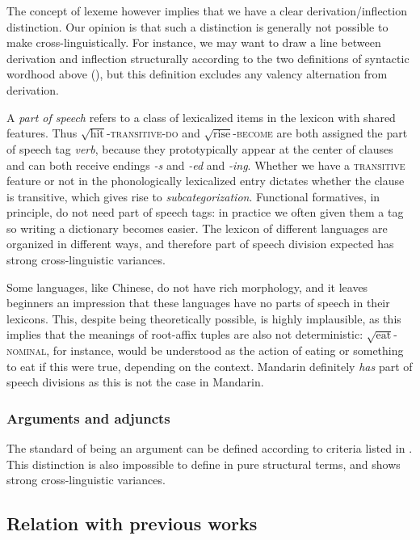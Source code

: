 \documentclass[UTF8, a4paper, oneside, scheme=plain, 12pt]{ctexrep}
\newcommand*{\term}[1]{\emph{#1}}
\newcommand{\form}[1]{\emph{#1}}
\newcommand*{\category}[1]{\textsc{#1}}
\newcommand*{\wordroot}[1]{$\sqrt{\text{#1}}$}
\begin{document}
{The concept of lexeme however implies that we have a clear derivation/inflection distinction.
Our opinion is that such a distinction is generally not possible to make cross-linguistically.
For instance, we may want to draw a line between derivation and inflection structurally
according to the two definitions of syntactic wordhood above (),
but this definition excludes any valency alternation from derivation.

A \term{part of speech} refers to a class of lexicalized items in the lexicon with shared features.
Thus \wordroot{hit}-\category{transitive}-\category{do}
and \wordroot{rise}-\category{become}
are both assigned the part of speech tag \term{verb},
because they prototypically appear at the center of clauses
and can both receive endings \form{-s} and \form{-ed} and \form{-ing}.
Whether we have a \category{transitive} feature or not in the phonologically lexicalized entry
dictates whether the clause is transitive,
which gives rise to \term{subcategorization}.
Functional formatives, in principle, do not need part of speech tags:
in practice we often given them a tag so writing a dictionary becomes easier.
The lexicon of different languages are organized in different ways,
and therefore part of speech division expected has strong cross-linguistic variances.

Some languages, like Chinese, do not have rich morphology,
and it leaves beginners an impression that these languages have no parts of speech in their lexicons.
This, despite being theoretically possible, is highly implausible,
as this implies that the meanings of root-affix tuples are also not deterministic:
\wordroot{eat}-\category{nominal}, for instance,
would be understood as the action of eating or something to eat if this were true,
depending on the context.
Mandarin definitely \emph{has} part of speech divisions
as this is not the case in Mandarin.

\subsubsection{Arguments and adjuncts}

The standard of being an argument can be defined according to 
criteria listed in .
This distinction is also impossible to define in pure structural terms,
and shows strong cross-linguistic variances.

\subsection{Relation with previous works}\label{sec:grammatical.previous}

}
\end{document}
